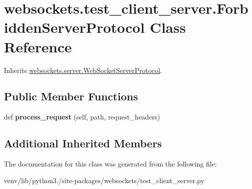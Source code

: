 \hypertarget{classwebsockets_1_1test__client__server_1_1_forbidden_server_protocol}{}\section{websockets.\+test\+\_\+client\+\_\+server.\+Forbidden\+Server\+Protocol Class Reference}
\label{classwebsockets_1_1test__client__server_1_1_forbidden_server_protocol}


Inherits \hyperlink{classwebsockets_1_1server_1_1_web_socket_server_protocol}{websockets.\+server.\+Web\+Socket\+Server\+Protocol}.

\subsection*{Public Member Functions}
\begin{DoxyCompactItemize}
\item 
\mbox{\label{classwebsockets_1_1test__client__server_1_1_forbidden_server_protocol_aeb0ee80f3287d16da6f9825284ed760d}} 
def {\bfseries process\+\_\+request} (self, path, request\+\_\+headers)
\end{DoxyCompactItemize}
\subsection*{Additional Inherited Members}


The documentation for this class was generated from the following file\+:\begin{DoxyCompactItemize}
\item 
venv/lib/python3./site-\/packages/websockets/test\+\_\+client\+\_\+server.\+py\end{DoxyCompactItemize}
